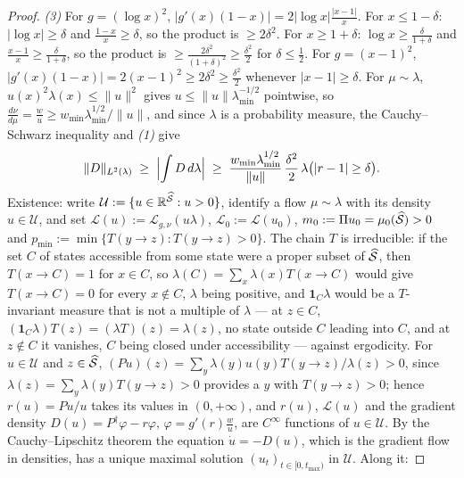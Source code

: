 \begin{proof}
\emph{(3)} For $g=(\log x)^2$, $|g'(x)(1-x)|=2|\log x|\frac{|x-1|}x$. For $x\leq1-\delta$: $|\log x|\geq\delta$ and $\frac{1-x}x\geq\delta$, so the product is $\geq2\delta^2$. For $x\geq1+\delta$: $\log x\geq\frac\delta{1+\delta}$ and $\frac{x-1}x\geq\frac\delta{1+\delta}$, so the product is $\geq\frac{2\delta^2}{(1+\delta)^2}\geq\frac{\delta^2}2$ for $\delta\leq\frac12$. For $g=(x-1)^2$, $|g'(x)(1-x)|=2(x-1)^2\geq2\delta^2\geq\frac{\delta^2}2$ whenever $|x-1|\geq\delta$. For $\mu\sim\lambda$, $u(x)^2\lambda(x)\leq\|u\|^2$ gives $u\leq\|u\|\lambda_{\min}^{-1/2}$ pointwise, so $\frac{d\nu}{d\mu}=\frac wu\geq w_{\min}\lambda_{\min}^{1/2}/\|u\|$, and since $\lambda$ is a probability measure, the Cauchy--Schwarz inequality and \emph{(1)} give
\begin{equation}\label{eq:unimodal_gradient_lower}
    \|D\|_{L^2(\lambda)}\;\geq\;\Bigl|\int D\,d\lambda\Bigr|\;\geq\;\frac{w_{\min}\lambda_{\min}^{1/2}}{\|u\|}\,\frac{\delta^2}2\,\lambda\bigl(|r-1|\geq\delta\bigr).
\end{equation}
Existence: write $\mathcal U:=\{u\in\mathbb R^{\widehat{\mathcal S}}:u>0\}$, identify a flow $\mu\sim\lambda$ with its density $u\in\mathcal U$, and set $\mathcal L(u):=\mathcal L_{g,\nu}(u\lambda)$, $\mathcal L_0:=\mathcal L(u_0)$, $m_0:=\Pi u_0=\mu_0(\widehat{\mathcal S})>0$ and $p_{\min}:=\min\{T(y\rightarrow z):T(y\rightarrow z)>0\}$. The chain $T$ is irreducible: if the set $C$ of states accessible from some state were a proper subset of $\widehat{\mathcal S}$, then $T(x\rightarrow C)=1$ for $x\in C$, so $\lambda(C)=\sum_x\lambda(x)T(x\rightarrow C)$ would give $T(x\rightarrow C)=0$ for every $x\notin C$, $\lambda$ being positive, and $\mathbf 1_C\lambda$ would be a $T$-invariant measure that is not a multiple of $\lambda$ --- at $z\in C$, $(\mathbf 1_C\lambda)T(z)=(\lambda T)(z)=\lambda(z)$, no state outside $C$ leading into $C$, and at $z\notin C$ it vanishes, $C$ being closed under accessibility --- against ergodicity. For $u\in\mathcal U$ and $z\in\widehat{\mathcal S}$, $(Pu)(z)=\sum_y\lambda(y)u(y)T(y\rightarrow z)/\lambda(z)>0$, since $\lambda(z)=\sum_y\lambda(y)T(y\rightarrow z)>0$ provides a $y$ with $T(y\rightarrow z)>0$; hence $r(u)=Pu/u$ takes its values in $(0,+\infty)$, and $r(u)$, $\mathcal L(u)$ and the gradient density $D(u)=P^\dagger\varphi-r\varphi$, $\varphi=g'(r)\frac wu$, are $C^\infty$ functions of $u\in\mathcal U$. By the Cauchy--Lipschitz theorem the equation $\dot u=-D(u)$, which is the gradient flow in densities, has a unique maximal solution $(u_t)_{t\in[0,t_{\max})}$ in $\mathcal U$. Along it:

\end{proof}
